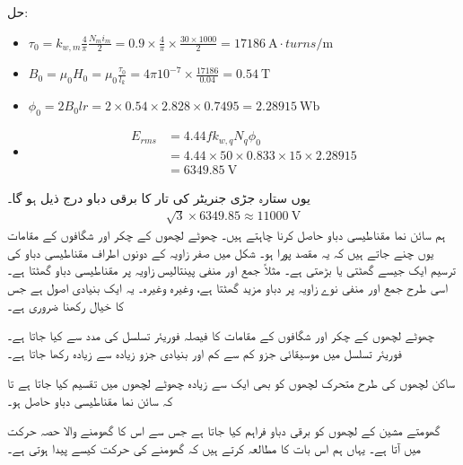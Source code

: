 حل:
\begin{itemize}
\item
\(
\tau_0=k_{w,m} \frac{4}{\pi}\frac{N_m i_m}{2}=0.9 \times \frac{4}{\pi} \times \frac{30 \times 1000}{2}=\SI{17186}{\ampere \cdot turns \per \meter}
\)
\item
\(
B_0=\mu_0 H_0=\mu_0 \frac{\tau_0}{l_k}=4 \pi 10^{-7} \times \frac{17186}{0.04}=\SI{0.54}{\tesla}
\)
\item
\(
\phi_0=2 B_0 l r =2 \times 0.54 \times 2.828 \times 0.7495=\SI{2.28915}{\weber}
\)
\item
\begin{align*}
E_{rms}&=4.44 f k_{w,q} N_q \phi_0\\
&=4.44 \times 50 \times 0.833 \times 15 \times 2.28915\\
&=\SI{6349.85}{\volt} 
\end{align*}
\end{itemize}
یوں ستارہ جڑی جنریٹر کی تار کا برقی دباو درج ذیل ہو گا۔
\begin{align*}
\sqrt{3} \times 6349.85 \approx \SI{11000}{\volt}
\end{align*}
%
ہم  سائن نما مقناطیسی دباو حاصل کرنا چاہتے ہیں۔ چھوٹے لچھوں کے چکر اور شگافوں کے مقامات یوں چنے جاتے ہیں کہ یہ مقصد پورا ہو۔ شکل   میں  صفر زاویہ کے دونوں اطراف مقناطیسی دباو کی ترسیم ایک جیسے گھٹتی یا بڑھتی ہے۔ مثلاً جمع اور منفی  پینتالیس زاویہ پر مقناطیسی دباو    گھٹتا ہے۔ اسی طرح جمع اور منفی نوے زاویہ پر دباو مزید   گھٹتا ہے، وغیرہ وغیرہ۔ یہ ایک بنیادی اصول ہے جس کا خیال رکھنا ضروری ہے۔

چھوٹے لچھوں کے چکر اور شگافوں کے مقامات کا فیصلہ فوریئر تسلسل کی مدد سے کیا جاتا ہے۔فوریئر تسلسل میں موسیقائی جزو  کم سے کم اور بنیادی جزو  زیادہ سے زیادہ رکھا جاتا ہے۔

ساکن لچھوں کی طرح متحرک لچھوں کو بھی ایک سے زیادہ چھوٹے لچھوں میں تقسیم کیا جاتا ہے تا کہ سائن نما مقناطیسی دباو حاصل ہو۔

گھومتے مشین کے لچھوں کو برقی دباو فراہم کیا جاتا ہے جس سے اس کا گھومنے والا حصہ حرکت میں آتا ہے۔ یہاں ہم اس بات کا مطالعہ کرتے ہیں کہ گھومنے کی حرکت کیسے پیدا ہوتی ہے۔

